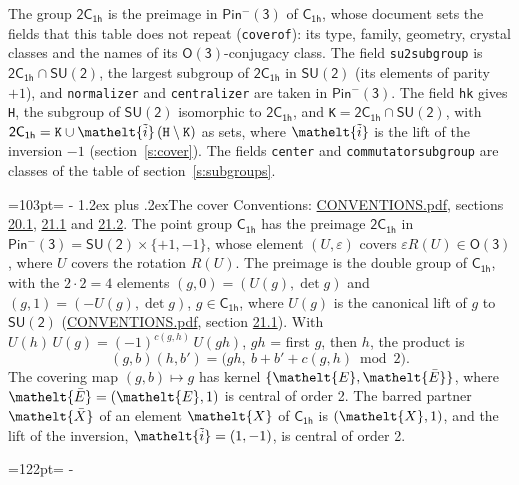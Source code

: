 \documentclass[10pt,a4paper]{article}
\makeatletter
\renewcommand\section{\@startsection{section}{1}{\z@}{-3ex plus -1ex minus -.2ex}%
  {1.2ex plus .2ex}{\normalfont\large\sffamily\bfseries\color{parttitle}}}
\newcommand{\needspace}[1]{\par\penalty-100\begingroup\dimen0=#1\relax\dimen2=\pagegoal
  \advance\dimen2-\pagetotal\ifdim\dimen0>\dimen2\relax\ifdim\dimen2>0pt\vfil\break\fi\fi
  \endgroup}
\numberwithin{equation}{section}
\newcommand{\eltfont}[1]{{\let\sigma\eltsigma\mathelt{#1}}}
\newcommand{\grp}[1]{\mathsf{#1}}
\newcommand{\elt}[1]{\eltfont{#1}}
\newcommand{\dirprod}{\times}
\newcommand{\barred}[1]{\bar{#1}}
\newcommand{\lift}[1]{\tilde{#1}}
\makeatother
\begin{document}
\leavevmode\label{n:element.inversion}\label{n:group.preimage}The group $\grp{2C_{1h}}$ is the preimage in $\grp{Pin^{-}(3)}$ of \href{../../../rotation/data/pdf/C1h.pdf}{$\grp{C_{1h}}$}, whose document sets the fields that this table does not repeat (\texttt{coverof}): its type, family, geometry, crystal classes and the names of its \href{../../../rotation/data/pdf/O3.pdf}{$\grp{O(3)}$}-conjugacy class. The field \texttt{su2subgroup} is $\grp{2C_{1h}} \cap \grp{SU(2)}$, the largest subgroup of $\grp{2C_{1h}}$ in $\grp{SU(2)}$ (its elements of parity $+1$), and \texttt{normalizer} and \texttt{centralizer} are taken in $\grp{Pin^{-}(3)}$. The field \texttt{hk} gives \texttt{H}, the subgroup of $\grp{SU(2)}$ isomorphic to $\grp{2C_{1h}}$, and \texttt{K}${} = \grp{2C_{1h}} \cap \grp{SU(2)}$, with $\grp{2C_{1h}} = \texttt{K} \cup \elt{\lift{i}}\,(\texttt{H} \setminus \texttt{K})$ as sets, where $\elt{\lift{i}}$ is the lift of the inversion $-1$ (section~\ref{s:cover}). The fields \texttt{center} and \texttt{commutatorsubgroup} are classes of the table of section~\ref{s:subgroups}.
\needspace{103pt}
\section{The cover}\label{s:cover}
Conventions: \href{../../CONVENTIONS.pdf}{CONVENTIONS.pdf}, sections \href{../../CONVENTIONS.pdf\#conv.20.1}{20.1}, \href{../../CONVENTIONS.pdf\#conv.21.1}{21.1} and \href{../../CONVENTIONS.pdf\#conv.21.2}{21.2}.
\leavevmode\label{n:group.pin.minus}\label{n:group.su2}\label{n:local.pin.sign}\label{n:matrix.covered}\label{n:matrix.lift.su2}\label{n:index.bar}The point group $\grp{C_{1h}}$ has the preimage $\grp{2C_{1h}}$ in $\grp{Pin^{-}(3)} = \grp{SU(2)} \dirprod \{+1, -1\}$, whose element $(U, \varepsilon)$ covers $\varepsilon R(U) \in \grp{O(3)}$, where $U$ covers the rotation $R(U)$. The preimage is the double group of $\grp{C_{1h}}$, with the $2 \cdot 2 = 4$ elements $(g, 0) = (U(g), \det g)$ and $(g, 1) = (-U(g), \det g)$, $g \in \grp{C_{1h}}$, where $U(g)$ is the canonical lift of $g$ to $\grp{SU(2)}$ (\href{../../CONVENTIONS.pdf}{CONVENTIONS.pdf}, section \href{../../CONVENTIONS.pdf\#conv.21.1}{21.1}). \label{n:function.cocycle}With $U(h)\,U(g) = (-1)^{c(g,h)}\,U(gh)$, $gh$ = first $g$, then $h$, the product is
\begin{equation}\label{e:product}(g, b)(h, b') = \bigl(gh,\ b + b' + c(g, h) \bmod 2\bigr).\end{equation}
\leavevmode\label{n:mark.bar}The covering map $(g, b) \mapsto g$ has kernel $\{\elt{E}, \elt{\barred{E}}\}$, where $\elt{\barred{E}} = (\elt{E}, 1)$ is central of order 2. \label{n:element.named}\label{n:mark.lift}The barred partner $\elt{\barred{X}}$ of an element $\elt{X}$ of $\grp{C_{1h}}$ is $(\elt{X}, 1)$, and the lift of the inversion, $\elt{\lift{i}} = (1, -1)$, is central of order 2.
\needspace{122pt}
\end{document}
